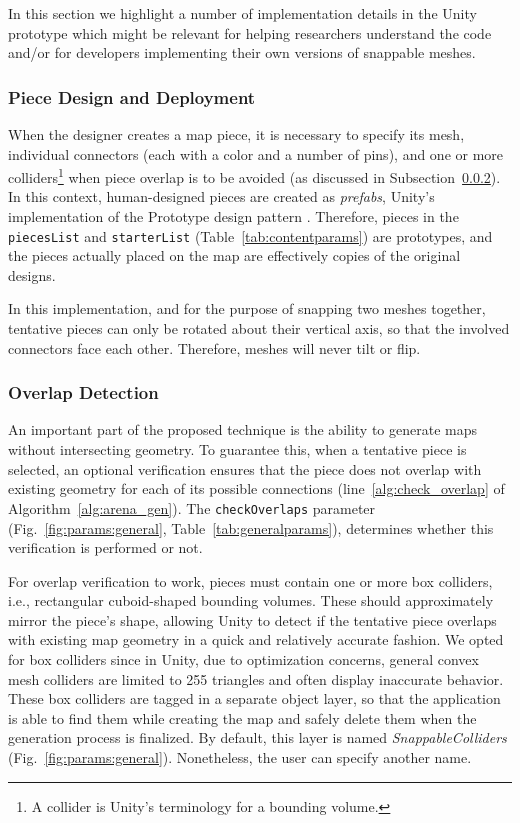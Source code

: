 \documentclass[journal]{IEEEtran}
\begin{document}
In this section we highlight a number of implementation details in the Unity prototype
which might be relevant for helping researchers understand the code and/or for developers
implementing their own versions of snappable meshes.

\subsubsection{Piece Design and Deployment}
\label{sec:impl:details:pieces}

When the designer creates a map piece, it is necessary to specify its mesh, individual
connectors (each with a color and a number of pins), and one or more colliders\footnote{A
collider is Unity's terminology for a bounding volume.} when piece overlap is to be
avoided (as discussed in Subsection~\ref{sec:impl:details:overlaps}). In this context,
human-designed pieces are created as \textit{prefabs}, Unity's implementation of the Prototype
design pattern \cite{nystrom2014game}. Therefore, pieces in the \texttt{piecesList} and
\texttt{starterList} (Table~\ref{tab:contentparams}) are prototypes, and the pieces actually
placed on the map are effectively copies of the original designs.

In this implementation, and for the purpose of snapping two meshes together, tentative pieces
can only be rotated about their vertical axis, so that the involved connectors face each other.
Therefore, meshes will never tilt or flip.

\subsubsection{Overlap Detection}
\label{sec:impl:details:overlaps}

An important part of the proposed technique is the ability to generate maps without
intersecting geometry. To guarantee this, when a tentative piece is selected, an
optional verification ensures that the piece does not overlap with existing
geometry for each of its possible connections (line~\ref{alg:check_overlap} of
Algorithm~\ref{alg:arena_gen}). The \texttt{checkOverlaps} parameter
(Fig.~\ref{fig:params:general}, Table~\ref{tab:generalparams}), determines whether
this verification is performed or not.

For overlap verification to work, pieces must contain one or more box colliders, i.e.,
rectangular cuboid-shaped bounding volumes. These should approximately mirror the
piece's shape, allowing Unity to detect if the tentative piece overlaps with existing map
geometry in a quick and relatively accurate fashion. We opted for box colliders since in
Unity, due to optimization concerns, general convex mesh colliders are limited to 255
triangles and often display inaccurate behavior. These box colliders are tagged in a
separate object layer, so that the application is able to find them while creating the
map and safely delete them when the generation process is finalized. By default, this
layer is named \textit{SnappableColliders} (Fig.~\ref{fig:params:general}).
Nonetheless, the user can specify another name.
\end{document}
